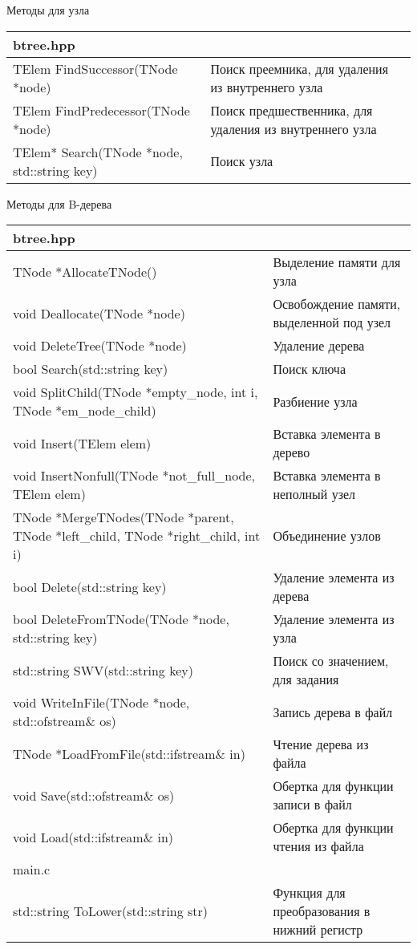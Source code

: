 Методы для узла

\begin{longtable}{|p{7.5cm}|p{7.5cm}|}
\hline
\rowcolor{lightgray}
\multicolumn{2}{|c|} {btree.hpp}\\
\hline
TElem FindSuccessor(TNode *node)&Поиск преемника, для удаления из внутреннего узла\\
\hline
\hline
TElem FindPredecessor(TNode *node)&Поиск предшественника, для удаления из внутреннего узла\\
\hline
\hline
TElem* Search(TNode *node, std::string key)&Поиск узла\\
\hline
\end{longtable}


Методы для B-дерева
\begin{longtable}{|p{7.5cm}|p{7.5cm}|}
\hline
\rowcolor{lightgray}
\multicolumn{2}{|c|} {btree.hpp}\\
\hline
TNode *AllocateTNode()&Выделение памяти для узла\\
\hline
\hline
void Deallocate(TNode *node)&Освобождение памяти, выделенной под узел\\
\hline
\hline
void DeleteTree(TNode *node)&Удаление дерева\\
\hline
\hline
bool Search(std::string key)&Поиск ключа\\
\hline
\hline
void SplitChild(TNode *empty{\_}node, int i, TNode *em{\_}node{\_}child)&Разбиение узла\\
\hline
\hline
void Insert(TElem elem)&Вставка элемента в дерево\\
\hline
\hline
void InsertNonfull(TNode *not{\_}full{\_}node, TElem elem)&Вставка элемента в неполный узел\\
\hline
\hline
TNode *MergeTNodes(TNode *parent, TNode *left{\_}child, TNode *right{\_}child, int i)&Объединение узлов\\
\hline
\hline
bool Delete(std::string key)&Удаление элемента из дерева\\
\hline
\hline
bool DeleteFromTNode(TNode *node, std::string key)&Удаление элемента из узла\\
\hline
\hline
std::string SWV(std::string key)&Поиск со значением, для задания\\
\hline
\hline
void WriteInFile(TNode *node, std::ofstream{\&} os)&Запись дерева в файл\\
\hline
\hline
TNode *LoadFromFile(std::ifstream{\&} in)&Чтение дерева из файла\\
\hline
\hline
void Save(std::ofstream{\&} os)&Обертка для функции записи в файл\\
\hline
\hline
void Load(std::ifstream{\&} in)&Обертка для функции чтения из файла\\
\hline
\rowcolor{lightgray}
\multicolumn{2}{|c|} {main.c}\\
\hline
std::string ToLower(std::string str)&Функция для преобразования в нижний регистр\\
\hline
\end{longtable}

